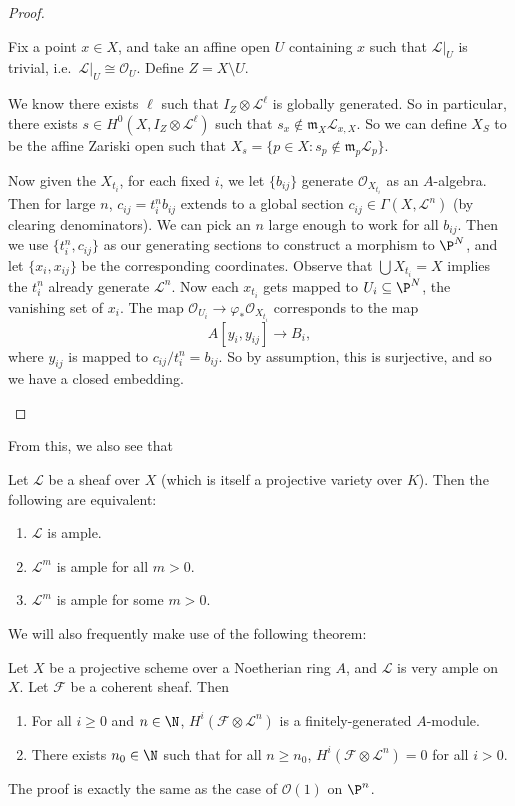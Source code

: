 \documentclass[a4paper]{article}
\begin{document}
\begin{proof}
\begin{itemize}
      Fix a point $x \in X$, and take an affine open $U$ containing $x$ such that $\mathcal{L}|_U$ is trivial, i.e.\ $\mathcal{L}|_U \cong \mathcal{O}_U$. Define $Z = X \setminus U$.

      We know there exists $\ell$ such that $I_Z \otimes \mathcal{L}^{\ell}$ is globally generated. So in particular, there exists $s \in H^0(X, I_Z \otimes \mathcal{L}^\ell)$ such that $s_x \not \in \mathfrak{m}_X \mathcal{L}_{x, X}$. So we can define $X_S$ to be the affine Zariski open such that $X_s = \{p \in X : s_p \not \in \mathfrak{m}_p \mathcal{L}_p\}$.

      Now given the $X_{t_i}$, for each fixed $i$, we let $\{b_{ij}\}$ generate $\mathcal{O}_{X_{t_i}}$ as an $A$-algebra. Then for large $n$, $c_{ij} = t_i^n b_{ij}$ extends to a global section $c_{ij} \in \Gamma(X, \mathcal{L}^n)$ (by clearing denominators). We can pick an $n$ large enough to work for all $b_{ij}$. Then we use $\{t_i^n, c_{ij}\}$ as our generating sections to construct a morphism to $\P^N$, and let $\{x_i, x_{ij}\}$ be the corresponding coordinates. Observe that $\bigcup X_{t_i} = X$ implies the $t_i^n$ already generate $\mathcal{L}^n$. Now each $x_{t_i}$ gets mapped to $U_i \subseteq \P^N$, the vanishing set of $x_i$. The map $\mathcal{O}_{U_i} \to \varphi_* \mathcal{O}_{X_{t_i}}$ corresponds to the map
      \[
        A[y_i, y_{ij}] \to B_i,
      \]
      where $y_{ij}$ is mapped to $c_{ij}/t_i^n = b_{ij}$. So by assumption, this is surjective, and so we have a closed embedding.\qedhere
  \end{itemize}
\end{proof}

From this, we also see that
\begin{prop}
  Let $\mathcal{L}$ be a sheaf over $X$ (which is itself a projective variety over $K$). Then the following are equivalent:
  \begin{enumerate}
    \item $\mathcal{L}$ is ample.
    \item $\mathcal{L}^m$ is ample for all $m > 0$.
    \item $\mathcal{L}^m$ is ample for some $m > 0$.
  \end{enumerate}
\end{prop}

We will also frequently make use of the following theorem:
\begin{thm}[Serre]
  Let $X$ be a projective scheme over a Noetherian ring $A$, and $\mathcal{L}$ is very ample on $X$. Let $\mathcal{F}$ be a coherent sheaf. Then
  \begin{enumerate}
    \item For all $i \geq 0$ and $n \in \N$, $H^i(\mathcal{F} \otimes \mathcal{L}^n)$ is a finitely-generated $A$-module.
    \item There exists $n_0 \in \N$ such that for all $n \geq n_0$, $H^i(\mathcal{F} \otimes \mathcal{L}^n) = 0$ for all $i > 0$.\fakeqed
  \end{enumerate}
\end{thm}
The proof is exactly the same as the case of $\mathcal{O}(1)$ on $\P^n$.
\end{document}
